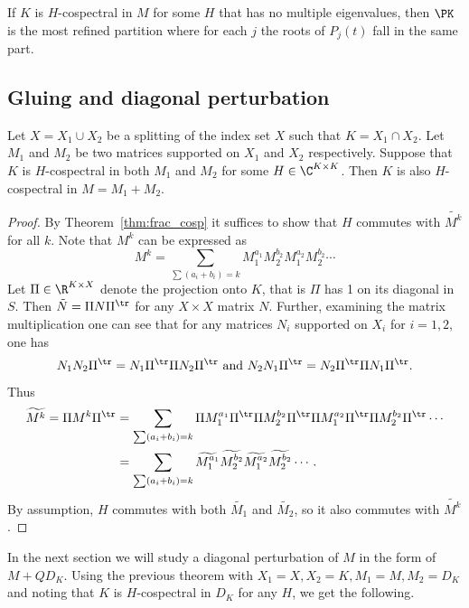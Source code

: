 \begin{coro}
If $K$ is $H$-cospectral in $M$ for some $H$ that has no multiple eigenvalues, then $\PK$ is the most refined partition where for each $j$ the roots of $P_
j(t)$ fall in the same part.
\end{coro}


\subsection{Gluing and diagonal perturbation}


\begin{theorem}\label{thm:gluing}
Let $X = X_1 \cup X_2$ be a splitting of the index set $X$ such that $K = X_1 \cap X_2$. Let $M_1$ and $M_2$ be two matrices supported on $X_1$ and $X_2$ respectively. Suppose that $K$ is $H$-cospectral in both $M_1$ and $M_2$ for some $H \in \C^{K \times K}$. Then $K$ is also $H$-cospectral in $M = M_1 + M_2$.
\end{theorem}

\begin{proof} By Theorem~\ref{thm:frac_cosp} it suffices to show that $H$ commutes with $\widetilde{M^k}$ for all $k$. Note that $M^k$ can be expressed as
\[
M^k = \sum_{\sum(a_i+b_i)=k} M_1^{a_1}M_2^{b_2} M_1^{a_2} M_2^{b_2}\cdots
\]
Let $\Pi \in \R^{K \times X}$ denote the projection onto $K$, that is $\Pi$ has 1 on its diagonal in $S$. Then $\tilde{N} = \Pi N \Pi^{\tr}$ for any $X\times X$ matrix $N$. Further,  examining the matrix multiplication one can see that for any matrices $N_i$ supported on $X_i$ for  $i = 1,2$, one has 
\[
N_1 N_2 \Pi^{\tr} = N_1 \Pi^{\tr} \Pi N_2 \Pi^{\tr} \mbox{ and } N_2 N_1 \Pi^{\tr} = N_2 \Pi^{\tr} \Pi N_1 \Pi^{\tr}.
\]
Thus
\begin{align*}
\widetilde{M^k} = \Pi M^k\Pi^{\tr} &= \sum_{\sum(a_i+b_i)=k} \Pi M_1^{a_1}\Pi^{\tr} \Pi  M_2^{b_2}\Pi^{\tr} \Pi M_1^{a_2}\Pi^{\tr} \Pi  M_2^{b_2}\Pi^{\tr} \cdots \\
&=  \sum_{\sum(a_i+b_i)=k} \widetilde{M_1^{a_1}}\widetilde{ M_2^{b_2}}\widetilde{M_1^{a_2}}\widetilde{M_2^{b_2}}\cdots.
\end{align*}
By assumption, $H$ commutes with both $\widetilde{M_1}$ and $\widetilde{M_2}$, so it also commutes with $\widetilde{M^k}$.
\end{proof}

In the next section we will study a diagonal perturbation of $M$ in the form of $M + Q D_K$. Using the previous theorem with $X_1 = X, X_2 = K, M_1 = M, M_2 = D_K$ and noting that $K$ is $H$-cospectral in $D_K$ for any $H$, we get the following.

